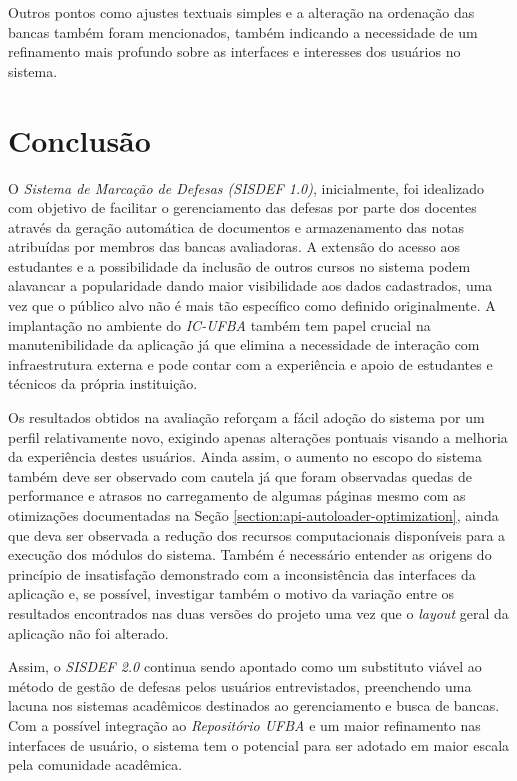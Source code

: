 \documentclass[nonacm, sigconf]{acmart}
\begin{document}
Outros pontos como ajustes textuais simples e a alteração na ordenação das bancas também foram mencionados, também indicando a necessidade de um refinamento mais profundo sobre as interfaces e interesses dos usuários no sistema.

\section{Conclusão}

O \textit{Sistema de Marcação de Defesas (SISDEF 1.0)}, inicialmente, foi idealizado com objetivo de facilitar o gerenciamento das defesas por parte dos docentes através da geração automática de documentos e armazenamento das notas atribuídas por membros das bancas avaliadoras. A extensão do acesso aos estudantes e a possibilidade da inclusão de outros cursos no sistema podem alavancar a popularidade dando maior visibilidade aos dados cadastrados, uma vez que o público alvo não é mais tão específico como definido originalmente. A implantação no ambiente do \textit{IC-UFBA} também tem papel crucial na manutenibilidade da aplicação já que elimina a necessidade de interação com infraestrutura externa e pode contar com a experiência e apoio de estudantes e técnicos da própria instituição.

Os resultados obtidos na avaliação reforçam a fácil adoção do sistema por um perfil relativamente novo, exigindo apenas alterações pontuais visando a melhoria da experiência destes usuários. Ainda assim, o aumento no escopo do sistema também deve ser observado com cautela já que foram observadas quedas de performance e atrasos no carregamento de algumas páginas mesmo com as otimizações documentadas na Seção \ref{section:api-autoloader-optimization}, ainda que deva ser observada a redução dos recursos computacionais disponíveis para a execução dos módulos do sistema. Também é necessário entender as origens do princípio de insatisfação demonstrado com a inconsistência das interfaces da aplicação e, se possível, investigar também o motivo da variação entre os resultados encontrados nas duas versões do projeto uma vez que o \textit{layout} geral da aplicação não foi alterado.

Assim, o \textit{SISDEF 2.0} continua sendo apontado como um substituto viável ao método de gestão de defesas pelos usuários entrevistados, preenchendo uma lacuna nos sistemas acadêmicos destinados ao gerenciamento e busca de bancas. Com a possível integração ao \textit{Repositório UFBA} e um maior refinamento nas interfaces de usuário, o sistema tem o potencial para ser adotado em maior escala pela comunidade acadêmica.



\end{document}
